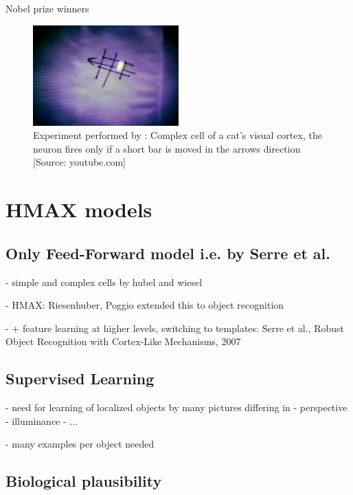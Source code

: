 		Nobel prize winners \citep{hubel1962receptive}
		
	
		\begin{figure}[H]
			\centering
			\captionsetup{justification=centering,margin=1cm}
			\includegraphics[width=0.5\textwidth]{images/hubel-experiment.png}
			\caption{Experiment performed by \citeauthor{hubel1962receptive}: Complex cell of a cat's visual cortex, the neuron fires only if a short bar is moved in the arrows direction [Source: youtube.com]}
		\end{figure}
		
	\section{HMAX models}
	
		\subsection{Only Feed-Forward model i.e. by Serre et al.}
		
			- simple and complex cells by hubel and wiesel
		
			- HMAX: Riesenhuber, Poggio extended this to object recognition
		
			- + feature learning at higher levels, switching to templates: Serre et al., Robust Object Recognition with Cortex-Like Mechanisms, 2007
			
		\subsection{Supervised Learning}
		
			- need for learning of localized objects by many pictures differing in
				- perspective
				- illuminance
				- ...
			
			- many examples per object needed
		
		\subsection{Biological plausibility}
		
